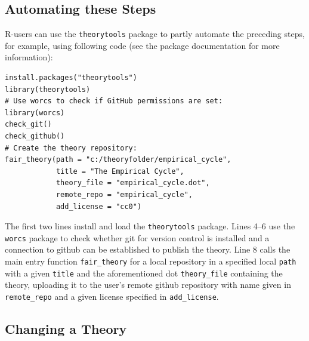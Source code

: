 \documentclass[
  man, noextraspace,floatsintext]{apa7}
\begin{document}
\subsection{Automating these Steps}\label{automating-these-steps}

R-users can use the \texttt{theorytools} package to partly automate the preceding steps, for example, using following code (see the package documentation for more information):

\begin{verbatim}
install.packages("theorytools")
library(theorytools)
# Use worcs to check if GitHub permissions are set:
library(worcs)
check_git()
check_github()
# Create the theory repository:
fair_theory(path = "c:/theoryfolder/empirical_cycle",
            title = "The Empirical Cycle",
            theory_file = "empirical_cycle.dot",
            remote_repo = "empirical_cycle",
            add_license = "cc0")
\end{verbatim}

The first two lines install and load the \texttt{theorytools} package. Lines 4--6 use the \texttt{worcs} package to check whether git for version control is installed and a connection to github can be established to publish the theory. Line 8 calls the main entry function \texttt{fair\_theory} for a local repository in a specified local \texttt{path} with a given \texttt{title} and the aforementioned dot \texttt{theory\_file} containing the theory, uploading it to the user's remote github repository with name given in \texttt{remote\_repo} and a given license specified in \texttt{add\_license}.

\subsection{Changing a Theory}\label{changing-a-theory}
\end{document}
